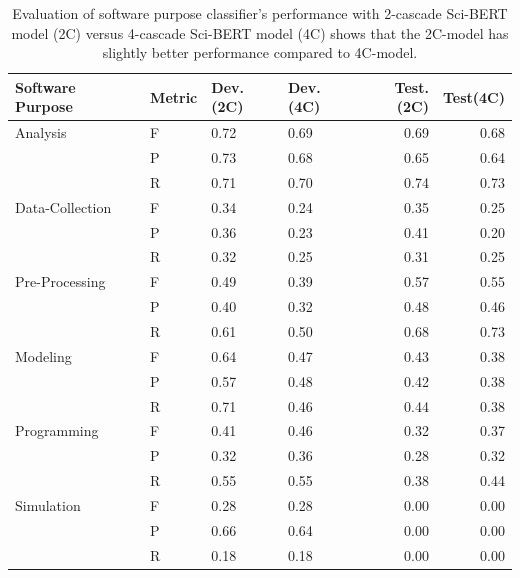 \begin{table}[ht]
	\centering
	\caption{Evaluation of software purpose classifier's performance with 2-cascade Sci-BERT model (2C) versus 4-cascade Sci-BERT model (4C) shows that the 2C-model has slightly better performance compared to 4C-model.}
	\begin{tabular*}{.90\textwidth}{@{\extracolsep{\fill}}  l  l l  l r r } %
		\hline
		Software Purpose & Metric & Dev.(2C)        & Dev.(4C)     & Test.(2C)  &Test(4C) \\
		\hline 
		Analysis        & F     & 0.72        & 0.69     &0.69     &0.68   \\
		& P     & 0.73        & 0.68     &0.65     &0.64   \\
		& R     & 0.71        & 0.70     &0.74     &0.73   \\
		\hline
		Data-Collection  & F     & 0.34        &  0.24    & 0.35    & 0.25  \\
		& P     & 0.36        &  0.23    & 0.41    & 0.20  \\
		& R     & 0.32        &  0.25    & 0.31    & 0.25  \\		
		
		\hline
		Pre-Processing   & F     & 0.49        &  0.39    & 0.57    & 0.55  \\
		& P     & 0.40        &  0.32    & 0.48    & 0.46  \\
		& R     & 0.61        &  0.50    & 0.68    & 0.73  \\
		\hline
		Modeling         & F     & 0.64        &  0.47    & 0.43    & 0.38  \\
		& P     & 0.57        &  0.48    & 0.42    & 0.38  \\
		& R     & 0.71        &  0.46    & 0.44    & 0.38  \\
		
		\hline
		Programming      & F     & 0.41        &  0.46    & 0.32    & 0.37  \\
		& P     & 0.32        &  0.36    & 0.28    & 0.32  \\
		& R     & 0.55        &  0.55    & 0.38    & 0.44  \\
		
		\hline
		Simulation      & F     & 0.28        &  0.28    & 0.00    & 0.00 \\
		& P     & 0.66        &  0.64    & 0.00    & 0.00  \\
		& R     & 0.18        &  0.18    & 0.00    & 0.00  \\
		

\end{tabular*}
\end{table}
